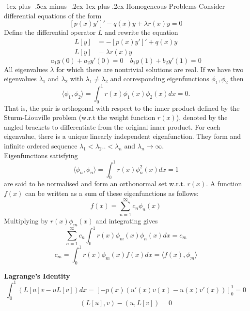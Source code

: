 \documentclass[10pt,landscape]{article}
\makeatletter
\renewcommand{\subsubsection}{\@startsection{subsubsection}{3}{0mm}%
                                {-1ex plus -.5ex minus -.2ex}%
                                {1ex plus .2ex}%
                                {\normalfont\small\bfseries}}
\newcommand{\lb}{\lambda}
\makeatother
\begin{document}
\begin{multicols}{3}
		\subsubsection{Homogeneous Problems}
		Consider differential equations of the form $$[ p(x)y']' - q(x)y + \lb r(x)y = 0 $$
		Define the differential operator $L$ and rewrite the equation 
		\begin{align*}
			L[y] &= -[ p(x)y']'  + q(x)y \\
			L[y] &= \lb r(x)y 
		\end{align*}
		$$a_1 y(0)+a_2y'(0) = 0 \quad b_1y(1) + b_2 y'(1) = 0$$
		All eigenvalues $\lb$ for which there are nontrivial solutions are real. If we have two eigenvalues $\lb_1$ and $\lb_2$ with $\lb_1 \neq \lb_2$ and corresponding eigenfunctions $\phi_1, \phi_2$ then 	$$ \langle \phi_1, \phi_2 \rangle = \int_0^1 r(x)\phi_1(x)\phi_2(x) dx = 0. $$
		That is, the pair is orthogonal with respect to the inner product defined by the Sturm-Liouville problem (w.r.t the weight function $r(x)$), denoted by the angled brackets to differentiate from the original inner product.  For each eigenvalue, there is a unique linearly independent eigenfunction. They form and infinite ordered sequence $\lb_1 < \lb_2 .. < \lb_n$ and $\lb_n \rightarrow \infty$. \\
		Eigenfunctions satisfying $$ \langle \phi_n, \phi_n \rangle = \int_0^1 r(x)\phi_n^2 (x) dx = 1 $$ are said to be normalised and form an orthonormal set w.r.t. $r(x)$. 
		A function$f(x)$ can be written as a sum of these eigenfunctions as follows:
		$$ f(x) = \sum_{n=1}^{\infty} c_n \phi_n(x) $$
		Multiplying by $r(x)\phi_m(x)$ and integrating gives
		$$ \sum_{n=1}^{\infty} c_n  \int_0^1 r(x)\phi_m(x)\phi_n(x) dx = c_m $$
		$$ c_m = \int_0^1 r(x)\phi_m(x)f(x) dx= \langle f(x), \phi_m \rangle $$

		
\textbf{Lagrange's Identity} $$ \int_0^1 (L[u]v - uL[v]) dx = [-p(x)(u'(x)v(x) - u(x)v'(x))]_0^1 = 0$$
$$  (L[u],v) -(u,L[v]) = 0 $$


\end{multicols}
\end{document}
